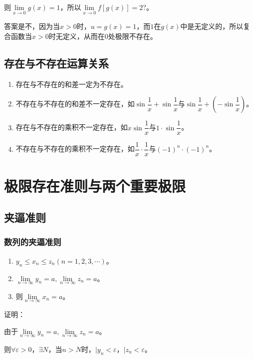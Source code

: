 \documentclass[UTF8, 12pt]{ctexart}
\begin{document}
则$\lim\limits_{x\to 0}g(x)=1$，所以$\lim\limits_{x\to 0}f[g(x)]=2?$。

答案是不，因为当$x>0$时，$u=g(x)=1$，而$1$在$g(x)$中是无定义的，所以复合函数当$x>0$时无定义，从而在$0$处极限不存在。

\subsection{存在与不存在运算关系}

\begin{enumerate}
    \item 存在与不存在的和差一定为不存在。
    \item 不存在与不存在的和差不一定存在，如$\sin\dfrac{1}{x}+\sin\dfrac{1}{x}$与$\sin\dfrac{1}{x}+\left(-\sin\dfrac{1}{x}\right)$。
    \item 存在与不存在的乘积不一定存在，如$x\sin\dfrac{1}{x}$与$1\cdot\sin\dfrac{1}{x}$。
    \item 不存在与不存在的乘积不一定存在，如$\dfrac{1}{x}\cdot\dfrac{1}{x}$与$(-1)^n\cdot(-1)^n$。
\end{enumerate}

\section{极限存在准则与两个重要极限}

\subsection{夹逼准则}

\subsubsection{数列的夹逼准则}

\begin{enumerate}
    \item $y_n\leqslant x_n\leqslant z_n(n=1,2,3,\cdots)$。
    \item $\lim\limits_{n\to\infty}y_n=a,\lim\limits_{n\to\infty}z_n=a$。
    \item 则$\lim\limits_{n\to\infty}x_n=a$。
\end{enumerate}

证明：

由于$\lim\limits_{n\to\infty}y_n=a,\lim\limits_{n\to\infty}z_n=a$。

则$\forall\varepsilon>0$，$\exists N$，当$n>N$时，$\vert y_n<\varepsilon$，$\vert z_n<\varepsilon$。
\end{document}
